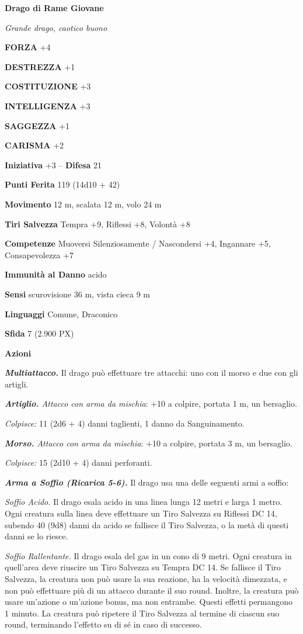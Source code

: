 \begin{multicols}{2}
	\medskip{}\textbf{Drago di Rame Giovane}

	\textit{Grande drago, caotico buono}

	\textbf{FORZA} +4

	\textbf{DESTREZZA} +1

	\textbf{COSTITUZIONE} +3

	\textbf{INTELLIGENZA} +3

	\textbf{SAGGEZZA} +1

	\textbf{CARISMA} +2

	\textbf{Iniziativa} +3 -- \textbf{Difesa} 21

	\textbf{Punti Ferita} 119 (14d10 + 42)

	\textbf{Movimento} 12 m, scalata 12 m, volo 24 m

	\textbf{Tiri Salvezza} Tempra +9, Riflessi +8, Volontà +8

	\textbf{Competenze} Muoversi Silenziosamente / Nascondersi +4, Ingannare +5, Consapevolezza +7

	\textbf{Immunità al Danno} acido

	\textbf{Sensi} scurovisione 36 m, vista cieca 9 m

	\textbf{Linguaggi} Comune, Draconico

	\textbf{Sfida} 7 (2.900 PX)

	\textbf{Azioni}

	\textit{\textbf{Multiattacco.}} Il drago può effettuare tre attacchi: uno con il morso e due con gli artigli.

	\textit{\textbf{Artiglio.} Attacco con arma da mischia}: +10 a colpire, portata 1 m, un bersaglio.

	\textit{Colpisce:} 11 (2d6 + 4) danni taglienti, 1 danno da Sanguinamento.

	\textit{\textbf{Morso.} Attacco con arma da mischia}: +10 a colpire, portata 3 m, un bersaglio.

	\textit{Colpisce:} 15 (2d10 + 4) danni perforanti.

	\textit{\textbf{Arma a Soffio (Ricarica 5-6).}} Il drago usa una delle seguenti armi a soffio:

	\textit{Soffio Acido.} Il drago esala acido in una linea lunga 12 metri e larga 1 metro. Ogni creatura sulla linea deve effettuare un Tiro Salvezza su Riflessi DC 14, subendo 40 (9d8) danni da acido se fallisce il Tiro Salvezza, o la metà di questi danni se lo riesce.

	\textit{Soffio Rallentante.} Il drago esala del gas in un cono di 9 metri. Ogni creatura in quell'area deve riuscire un Tiro Salvezza su Tempra DC 14. Se fallisce il Tiro Salvezza, la creatura non può usare la sua reazione, ha la velocità dimezzata, e non può effettuare più di un attacco durante il suo round. Inoltre, la creatura può usare un'azione o un'azione bonus, ma non entrambe. Questi effetti permangono 1 minuto. La creatura può ripetere il Tiro Salvezza al termine di ciascun suo round, terminando l'effetto su di sé in caso di successo.


\end{multicols}
